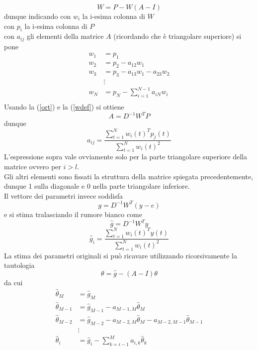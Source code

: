 \documentclass[10pt,a4paper]{book}
\begin{document}
\begin{equation}
W=P-W(A-I)
\end{equation}
dunque indicando con $w_i$ la i-esima colonna di $W$\\
con $p_i$ la i-esima colonna di $P$\\
con $a_{ij}$ gli elementi della matrice $A$ (ricordando che è triangolare superiore)
si pone
\begin{align*}
w_1&=p_1\\
w_2&=p_2-a_{12}w_1\\
w_3&=p_3-a_{13}w_1-a_{23}w_2\\
&\vdots\\
w_N&=p_N-\sum_{i=1}^{N-1}a_{iN}w_i\\
\end{align*}
Usando la (\ref{ort}) e la (\ref{wdef}) si ottiene 
\begin{equation}
A=D^{-1}W^TP
\end{equation}
dunque
\begin{equation}
a_{ij}=\frac{\sum_{t=1}^N{w_i(t)^Tp_j(t)}}{\sum_{t=1}^Nw_i(t)^2}
\end{equation}
L'espressione sopra vale ovviamente solo per la parte triangolare superiore della matrice ovvero per $i>l$.\\
Gli altri elementi sono fissati la struttura della matrice spiegata precedentemente, dunque 1 sulla diagonale e 0 nella parte triangolare inferiore.\\
Il vettore dei parametri invece soddisfa
\begin{equation}
g=D^{-1}W^T(y-e)
\end{equation}
e  si stima tralasciando il rumore bianco come
\begin{equation}
\hat{g}=D^{-1}W^Ty
\end{equation}
\begin{equation}
\hat{g}_i=\frac{\sum_{t=1}^N{w_i(t)^Ty(t)}}{\sum_{t=1}^Nw_i(t)^2}
\end{equation}
La stima dei parametri originali  si può ricavare utilizzando ricorsivamente la tautologia
\begin{equation}
\theta=\hat{g}-(A-I)\theta
\end{equation}
da cui
\begin{align*}
\label{origparam}
\hat{\theta}_M &=\hat{g}_M\\
\hat{\theta}_{M-1} &=\hat{g}_{M-1}-a_{M-1,M}\hat{\theta}_M\\
\hat{\theta}_{M-2} &=\hat{g}_{M-2}-a_{M-2,M}\hat{\theta}_M-a_{M-2,M-1}\hat{\theta}_{M-1}\\
&\vdots \\
\hat{\theta}_{i} &=\hat{g}_{i}-\sum_{k=i-1}^Ma_{i,k}\hat{\theta}_k\\
\end{align*}
\end{document}
